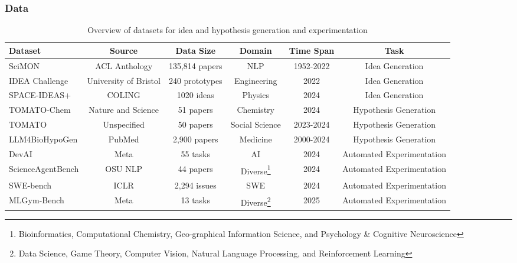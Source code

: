 \subsubsection{Data}


\begin{table*}[h]
\centering 
\footnotesize
\setlength\tabcolsep{4pt} 
\begin{tabular}{lccccc}
\toprule
\textbf{Dataset} & \textbf{Source} & \textbf{Data Size} & \textbf{Domain} & \textbf{Time Span} & \textbf{Task}\\ 
\toprule
SciMON \cite{chai2024exploring} & ACL Anthology & 135,814 papers &  NLP   & 1952-2022 & Idea Generation\\ 
IDEA Challenge \cite{ege2023idea} & University of Bristol & 240 prototypes &  Engineering  & 2022 & Idea Generation\\ 
SPACE-IDEAS+ \cite{garcia-silva-etal-2024-space} & COLING & 1020 ideas &  Physics  & 2024 & Idea Generation\\ 
TOMATO-Chem \cite{yang2024moose} & Nature and Science & 51 papers & Chemistry & 2024 & Hypothesis Generation\\
TOMATO \cite{yang2023large} & Unspecified & 50 papers & Social Science & 2023-2024 & Hypothesis Generation\\
LLM4BioHypoGen \cite{qi2024large} & PubMed & 2,900 papers & Medicine & 2000-2024 & Hypothesis Generation\\
DevAI \cite{zhuge2024agent} & Meta & 55 tasks & AI & 2024 & Automated Experimentation\\
ScienceAgentBench \cite{chen2024scienceagentbenchrigorousassessmentlanguage} & OSU NLP & 44 papers & Diverse\footnote{Bioinformatics, Computational Chemistry, Geo-graphical Information Science, and Psychology \& Cognitive Neuroscience} & 2024 & Automated Experimentation\\
SWE-bench \cite{jimenez2024swebench} & ICLR & 2,294 issues & SWE & 2024 & Automated Experimentation\\
MLGym-Bench \cite{nathani2025mlgymnewframeworkbenchmark} & Meta & 13 tasks & Diverse\footnote{Data Science, Game Theory, Computer Vision, Natural Language Processing, and Reinforcement Learning} & 2025 & Automated Experimentation\\
\bottomrule
\end{tabular}
\caption{Overview of datasets for idea and hypothesis generation and experimentation}
\label{tab:section4.2_dataset}
\vspace{-5mm}
\end{table*}

